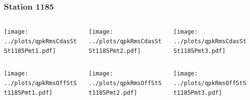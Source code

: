 \documentclass[aspectratio=169]{beamer}
\begin{document}
\begin{frame} 
  \frametitle{Station 1185}
  \begin{center}
    \begin{columns}
      \begin{column}{0.33\textwidth}
        \texttt{[image: ../plots/qpkRmsCdasStSt1185Pmt1.pdf]}
      \end{column}
      \begin{column}{0.33\textwidth}
        \texttt{[image: ../plots/qpkRmsCdasStSt1185Pmt2.pdf]}
      \end{column}
      \begin{column}{0.33\textwidth}
        \texttt{[image: ../plots/qpkRmsCdasStSt1185Pmt3.pdf]}
      \end{column}
    \end{columns}
  \end{center}

  \begin{center}
    \begin{columns}
      \begin{column}{0.33\textwidth}
        \texttt{[image: ../plots/qpkRmsOffStSt1185Pmt1.pdf]}
      \end{column}
      \begin{column}{0.33\textwidth}
        \texttt{[image: ../plots/qpkRmsOffStSt1185Pmt2.pdf]}
      \end{column}
      \begin{column}{0.33\textwidth}
        \texttt{[image: ../plots/qpkRmsOffStSt1185Pmt3.pdf]}
      \end{column}
    \end{columns}
  \end{center}
\end{frame}
\end{document}
